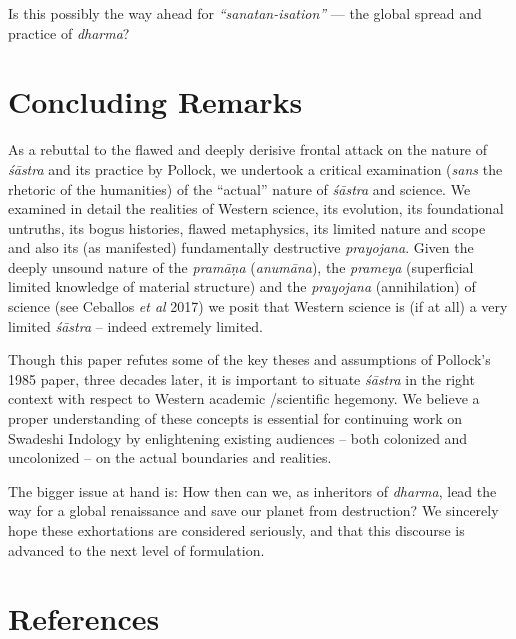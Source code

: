 Is this possibly the way ahead for \textit{“sanatan-isation”} — the global spread and practice of \textit{dharma}?


\section*{Concluding Remarks}

As a rebuttal to the flawed and deeply derisive frontal attack on the nature of \textit{śāstra} and its practice by Pollock, we undertook a critical examination (\textit{sans} the rhetoric of the humanities) of the “actual” nature of \textit{śāstra} and science. We examined in detail the realities of Western science, its evolution, its foundational untruths, its bogus histories, flawed metaphysics, its limited nature and scope and also its (as manifested) fundamentally destructive \textit{prayojana}. Given the deeply unsound nature of the \textit{pramāṇa} (\textit{anumāna}), the \textit{prameya} (superficial limited knowledge of material structure) and the \textit{prayojana} (annihilation) of science (see Ceballos \textit{et al} 2017) we posit that Western science is (if at all) a very limited \textit{śāstra} – indeed extremely limited.

Though this paper refutes some of the key theses and assumptions of Pollock’s 1985 paper, three decades later, it is important to situate \textit{śāstra} in the right context with respect to Western academic /scientific hegemony. We believe a proper understanding of these concepts is essential for continuing work on Swadeshi Indology by enlightening existing audiences – both colonized and uncolonized – on the actual boundaries and realities.

The bigger issue at hand is: How then can we, as inheritors of \textit{dharma}, lead the way for a global renaissance and save our planet from destruction? We sincerely hope these exhortations are considered seriously, and that this discourse is advanced to the next level of formulation.


\section*{References}

